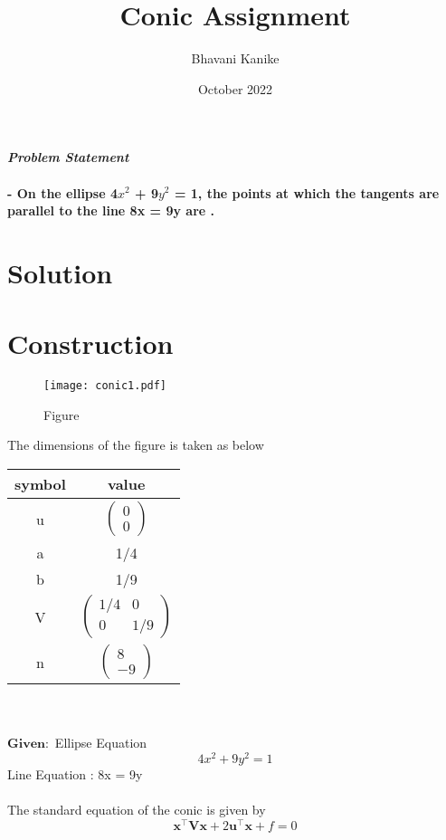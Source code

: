 \documentclass[journal,10pt,twocolumn]{article}
\title{\textbf{Conic Assignment}}
\author{Bhavani Kanike}
\date{October 2022}
\let\vec\mathbf
\newcommand{\myvec}[1]{\ensuremath{\begin{pmatrix}#1\end{pmatrix}}}
\begin{document}
\maketitle
\paragraph{\textit{Problem Statement} \\\\- On the ellipse 4$x^2$ + 9$y^2$ = 1, the points at which the tangents are parallel to the line 8x = 9y are . }

\section*{\large Solution}

\section*{\large Construction}

\begin{figure}[h]
\centering
\texttt{[image: conic1.pdf]}
\caption{Figure}
\label{fig:triangle}
\end{figure}

The dimensions of the figure is taken as below\\
{
\setlength\extrarowheight{2pt}
\centering
	\begin{tabular}{|c|c|}
	\hline
	\textbf{symbol}&\textbf{value}\\
	\hline
	u &$\myvec{0\\0}$\\
	\hline
	a&1/4\\
	\hline
	b&1/9\\
	\hline
	V&$\myvec{1/4&0\\0&1/9}$\\
	\hline
	n&$\myvec{8\\-9}$\\
	\hline
\end{tabular}
}\\\\

	$\boldsymbol{Given :}$ Ellipse Equation\\
\begin{equation}
	4x^2 + 9y^2 = 1
\end{equation}
 Line Equation :	8x = 9y\\\\
 The standard equation of the conic is given by \\
\begin{equation}
	\vec{x}^{\top}\vec{V}\vec{x}+2\vec{u}^{\top}\vec{x}+f=0
\end{equation}
 
\end{document}
